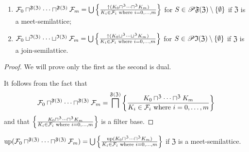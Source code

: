 \begin{thm}
~
\begin{enumerate}
\item $\mathcal{F}_{0}\sqcap^{\mathfrak{F}(\mathfrak{Z})}\dots\sqcap^{\mathfrak{F}(\mathfrak{Z})}\mathcal{F}_{m}=\bigcup\left\{ \frac{\uparrow(K_{0}\sqcap^{\mathfrak{Z}}\dots\sqcap^{\mathfrak{Z}}K_{m})}{K_{i}\in\mathcal{F}_{i}\text{ where }i=0,\dots,m}\right\}$
for $S\in\mathscr{P}\mathfrak{F}(\mathfrak{Z})\setminus\{\emptyset\}$
if $\mathfrak{Z}$ is a meet-semilattice;
\item $\mathcal{F}_{0}\sqcup^{\mathfrak{I}(\mathfrak{Z})}\dots\sqcup^{\mathfrak{I}(\mathfrak{Z})}\mathcal{F}_{m}=\bigcup\left\{ \frac{\uparrow(K_{0}\sqcup^{\mathfrak{Z}}\dots\sqcup^{\mathfrak{Z}}K_{m})}{K_{i}\in\mathcal{F}_{i}\text{ where }i=0,\dots,m}\right\}$
for $S\in\mathscr{P}\mathfrak{I}(\mathfrak{Z})\setminus\{\emptyset\}$
if $\mathfrak{Z}$ is a join-semilattice.
\end{enumerate}
\end{thm}
\begin{proof}
We will prove only the first as the second is dual.

It follows from the fact that
\[
\mathcal{F}_{0}\sqcap^{\mathfrak{F}(\mathfrak{Z})}\dots\sqcap^{\mathfrak{F}(\mathfrak{Z})}\mathcal{F}_{m}=
\bigsqcap^{\mathfrak{F}(\mathfrak{Z})}\left\{ \frac{K_{0}\sqcap^{\mathfrak{Z}}\dots\sqcap^{\mathfrak{Z}}K_{m}}{K_{i}\in\mathcal{F}_{i}\text{ where }i=0,\dots,m}\right\}
\]
and that $\left\{ \frac{K_{0}\sqcap^{\mathfrak{Z}}\dots\sqcap^{\mathfrak{Z}}K_{m}}{K_{i}\in\mathcal{F}_{i}\text{ where }i=0,\dots,m}\right\}$
is a filter base.\end{proof}
\begin{cor}
$\operatorname{up}(\mathcal{F}_{0}\sqcap^{\mathfrak{F}(\mathfrak{Z})}\dots\sqcap^{\mathfrak{F}(\mathfrak{Z})}\mathcal{F}_{m})=\bigcup\left\{ \frac{\operatorname{up}(K_{0}\sqcap^{\mathfrak{Z}}\dots\sqcap^{\mathfrak{Z}}K_{m})}{K_{i}\in\mathcal{F}_{i}\text{ where }i=0,\dots,m}\right\}$
if $\mathfrak{Z}$ is a meet-semilattice.
\end{cor}

